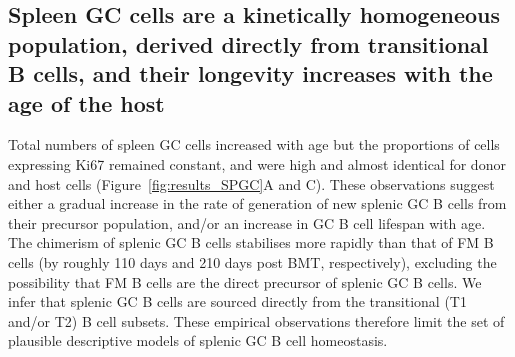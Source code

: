 \documentclass[12pt]{article}
\newcommand{\red}[1]{{\color{red}{#1}}}
\begin{document}
%	
%


\subsection*{Spleen GC cells are a kinetically homogeneous population, derived directly from transitional B cells, and their longevity increases with the age of the host}
	
Total numbers of spleen GC cells increased with age but the proportions of  cells expressing Ki67 remained constant, and were high and almost identical for donor and host cells (Figure~\ref{fig:results_SPGC}A and C). These observations suggest either a gradual increase in the rate of generation of new splenic GC B cells from their precursor population, and/or an increase in GC B cell lifespan with age. The chimerism of splenic GC B cells stabilises more rapidly than that of FM B cells (by roughly 110 days and 210 days post BMT, respectively), excluding the possibility that FM B cells are  the direct precursor of splenic GC B cells. We infer that splenic GC B cells are  sourced directly from the transitional (T1 and/or T2) B cell subsets.  These empirical observations therefore limit the set of plausible descriptive models of splenic GC B cell homeostasis.

\red{Chimerism saturates at <1 suggesting another alternative model - incumbent}


\end{document}
